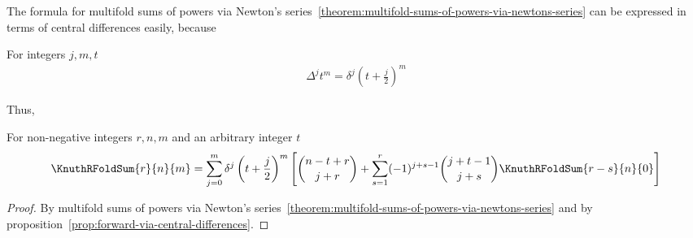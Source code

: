 The formula for multifold sums of powers via Newton's 
series~\eqref{theorem:multifold-sums-of-powers-via-newtons-series}
can be expressed in terms of central differences easily, because
\begin{proposition} For integers $j,m,t$
    \label{prop:forward-via-central-differences}
    \begin{align*}
        \Delta^{j} t^{m} = \delta^{j} \left( t+ \frac{j}{2} \right)^{m}
    \end{align*}
\end{proposition}
Thus,
\begin{proposition}
    \label{prop:multifold-sums-of-powers-via-central-differences}
    \begin{mdframed}
        For non-negative integers $r,n,m$ and an arbitrary integer $t$
        \begin{align*}
            \KnuthRFoldSum{r}{n}{m} 
            = \sum_{j=0}^{m} \delta^{j} \left( t + \frac{j}{2} \right)^m \left[\binom{n-t+r}{j+r} + \sum_{s=1}^{r} (-1)^{j+s-1} \binom{j+t-1}{j+s} \KnuthRFoldSum{r-s}{n}{0} \right]
        \end{align*}
    \end{mdframed}
    \begin{proof}
        By multifold sums of powers via Newton's series~\eqref{theorem:multifold-sums-of-powers-via-newtons-series} and
        by proposition~\eqref{prop:forward-via-central-differences}.
    \end{proof}
\end{proposition}
